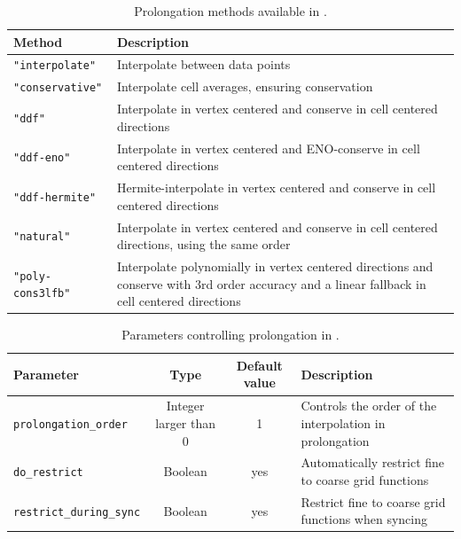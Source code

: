 \begin{table}[ht]
  \centering
  \begin{tabular*}{\textwidth}{lp{35em}}
    Method                   & Description                                                                                                                                   \\\hline\hline
    \texttt{"interpolate"}   & Interpolate between data points                                                                                                               \\
    \texttt{"conservative"}  & Interpolate cell averages, ensuring conservation                                                                                              \\
    \texttt{"ddf"}           & Interpolate in vertex centered and conserve in cell centered directions                                                                       \\
    \texttt{"ddf-eno"}       & Interpolate in vertex centered and ENO-conserve in cell centered directions                                                                   \\
    \texttt{"ddf-hermite"}   & Hermite-interpolate in vertex centered and conserve in cell centered directions                                                               \\
    \texttt{"natural"}       & Interpolate in vertex centered and conserve in cell centered directions, using the same order                                                 \\
    \texttt{"poly-cons3lfb"} & Interpolate polynomially in vertex centered directions and conserve with 3rd order accuracy and a linear fallback in cell centered directions \\\hline\hline
  \end{tabular*}
  \caption{Prolongation methods available in \CarpetX.}
  \label{tab:prolongation_methods}
\end{table}

\begin{table}[ht]
  \centering
  \begin{tabular*}{\textwidth}{lccp{15em}}
    Parameter                       & Type                  & Default value & Description                                             \\\hline\hline
    \texttt{prolongation\_order}    & Integer larger than 0 & 1             & Controls the order of the interpolation in prolongation \\
    \texttt{do\_restrict}           & Boolean               & yes           & Automatically restrict fine to coarse grid functions    \\
    \texttt{restrict\_during\_sync} & Boolean               & yes           & Restrict fine to coarse grid functions when syncing     \\
  \end{tabular*}
  \caption{Parameters controlling prolongation in \CarpetX.}
  \label{tab:other_prolongation_params}
\end{table}

